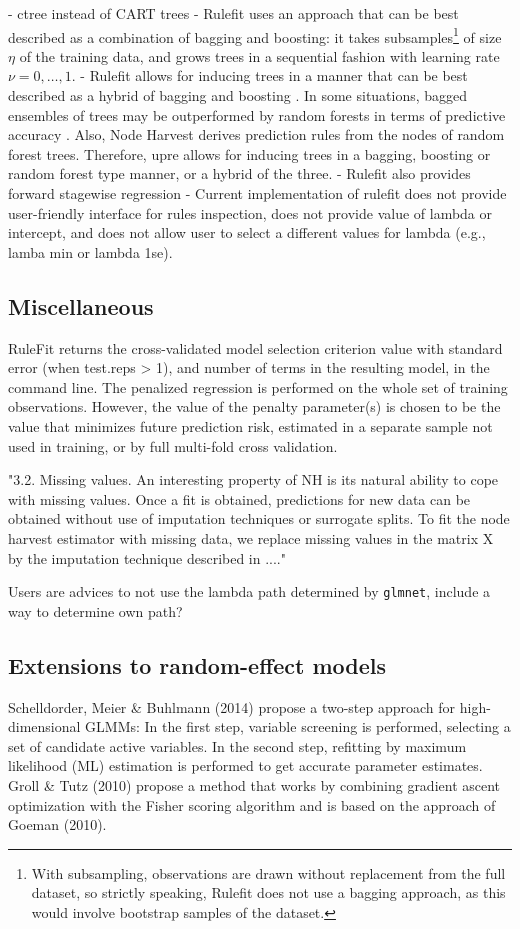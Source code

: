 \documentclass[nobf,doc]{apa}
\begin{document}
- ctree instead of CART trees
- Rulefit uses an approach that can be best described as a combination of bagging and boosting: it takes subsamples\footnote{With subsampling, observations are drawn without replacement from the full dataset, so strictly speaking, Rulefit does not use a bagging approach, as this would involve bootstrap samples of the dataset.} of size $\eta$ of the training data, and grows trees in a sequential fashion with learning rate $\nu = 0, \dots, 1$.
- Rulefit allows for inducing trees in a manner that can be best described as a hybrid of bagging \cite{Brei96bagging} and boosting \cite{Frie01}. In some situations, bagged ensembles of trees may be outperformed by random forests in terms of predictive accuracy \cite{Diet00bbrf}. Also, Node Harvest derives prediction rules from the nodes of random forest trees. Therefore, upre allows for inducing trees in a bagging, boosting or random forest type manner, or a hybrid of the three.    
- Rulefit also provides forward stagewise regression
- Current implementation of rulefit does not provide user-friendly interface for rules inspection, does not provide value of lambda or intercept, and does not allow user to select a different values for lambda (e.g., lamba min or lambda 1se).

\subsection{Miscellaneous}

RuleFit returns the cross-validated model selection criterion value with standard error (when test.reps > 1), and number of terms in the resulting model, in the command line. 
The penalized regression is performed on the whole set of training observations. However, the value of the penalty parameter(s) is chosen to be the value that minimizes future prediction risk, estimated in a separate sample not used in training, or by full multi-fold cross validation.

"3.2. Missing values. An interesting property of NH is its natural ability to
cope with missing values. Once a fit is obtained, predictions for new data can be
obtained without use of imputation techniques or surrogate splits. To fit the node
harvest estimator with missing data, we replace missing values in the matrix X
by the imputation technique described in ...."

Users are advices to not use the lambda path determined by \verb|glmnet|, include a way to determine own path? 


\subsection{Extensions to random-effect models}
Schelldorder, Meier \& Buhlmann (2014) propose a two-step approach for high-dimensional GLMMs: In the first step, variable screening is performed, selecting a set of candidate active variables. In the second step, refitting by maximum likelihood (ML) estimation is performed to get accurate parameter estimates.
Groll \& Tutz (2010) propose a method that works by combining gradient ascent optimization with the Fisher scoring algorithm and is based on the approach of Goeman (2010).
 
\end{document}
